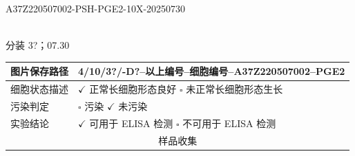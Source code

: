 \documentclass[UTF8,10pt,a4paper,fontset=fandol]{ctexart}
\newcommand{\fieldvalue}[1]{#1}
\newcommand{\handwritten}[1]{#1}
\begin{document}
\noindent
\fieldvalue{A37Z220507002-PSH-PGE2-10X-20250730}

\vspace{1mm}
\begin{center}
\fbox{\rule{0pt}{42mm}\rule{0.43\textwidth}{0pt}}\\[-1mm]
\handwritten{分装 3?；07.30}
\end{center}

\noindent
\begin{tabularx}{\textwidth}{|p{}|X|}
\hline
图片保存路径 &
\fieldvalue{\handwritten{4/10/3?/-D?--以上编号--细胞编号--A37Z220507002--PGE2}}
\\
\hline
细胞状态描述 &
\fieldvalue{\(\checkmark\) 正常长细胞形态良好 \quad $\square$ 未正常长细胞形态生长}
\\
\hline
污染判定 &
$\square$ 污染 \quad
\fieldvalue{\(\checkmark\) 未污染}
\\
\hline
实验结论 &
\fieldvalue{\(\checkmark\) 可用于 ELISA 检测}
\quad $\square$ 不可用于 ELISA 检测
\\
\hline
\multicolumn{2}{|c|}{样品收集}\\
\hline
\end{tabularx}
\end{document}
